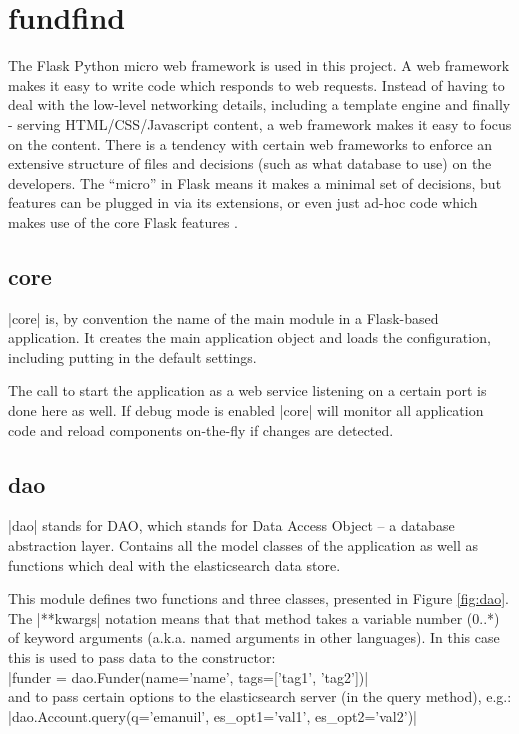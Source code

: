 \section{fundfind}
\label{design-main-first}
The Flask Python micro web framework \cite{flask} is used in this project. A web framework makes it easy to write code which responds to web requests. Instead of having to deal with the low-level networking details, including a template engine and finally - serving HTML/CSS/Javascript content, a web framework makes it easy to focus on the content. There is a tendency with certain web frameworks to enforce an extensive structure of files and decisions (such as what database to use) on the developers. The ``micro'' in Flask means it makes a minimal set of decisions, but features can be plugged in via its extensions, or even just ad-hoc code which makes use of the core Flask features \cite{flask-foreword}.

\subsection{core}

|core| is, by convention the name of the main module in a Flask-based application. It creates the main application object and loads the configuration, including putting in the default settings.

The call to start the application as a web service listening on a certain port is done here as well. If debug mode is enabled |core| will monitor all application code and reload components on-the-fly if changes are detected.

\subsection{dao}
\label{design-dao}
|dao| stands for DAO, which stands for Data Access Object – a database abstraction layer. Contains all the model classes of the application as well as functions which deal with the elasticsearch data store.

This module defines two functions and three classes, presented in Figure \ref{fig:dao}. The |**kwargs| notation means that that method takes a variable number (0..*) of keyword arguments (a.k.a. named arguments in other languages). In this case this is used to pass data to the constructor:
\\ |funder = dao.Funder(name='name', tags=['tag1', 'tag2'])|
\\ and to pass certain options to the elasticsearch server (in the query method), e.g.:
\\ |dao.Account.query(q='emanuil', es_opt1='val1', es_opt2='val2')|

